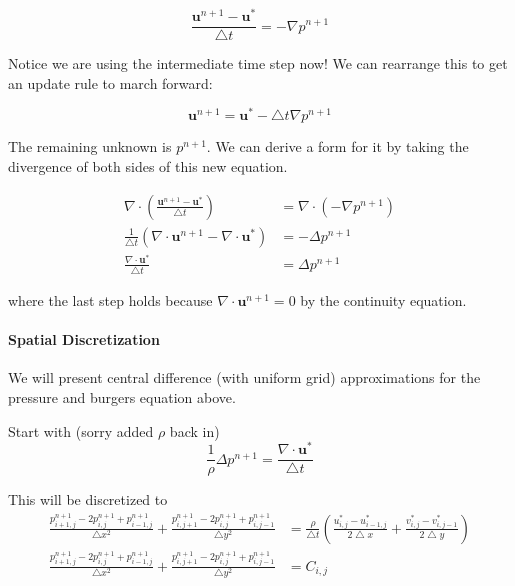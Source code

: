 \documentclass[12pt]{article}
\begin{document}
\begin{equation}
    \frac{\mathbf{u}^{n+1} - \mathbf{u}^*}{\bigtriangleup t} = -\nabla p^{n+1}
\end{equation}

Notice we are using the intermediate time step now! We can rearrange this to get an update rule to march forward:

\begin{equation}
    \mathbf{u}^{n+1} = \mathbf{u}^* - \bigtriangleup t \nabla p^{n+1}
\end{equation}

The remaining unknown is $p^{n+1}$. We can derive a form for it by taking the divergence of both sides of this new equation.

\begin{align*}
    \nabla \cdot (\frac{\mathbf{u}^{n+1} - \mathbf{u}^*}{\bigtriangleup t}) &= \nabla \cdot (-\nabla p^{n+1}) \\
    \frac{1}{\bigtriangleup t}(\nabla \cdot \mathbf{u}^{n+1} - \nabla \cdot \mathbf{u}^*) &= -\Delta p^{n+1} \\
    \frac{\nabla \cdot \mathbf{u}^*}{\bigtriangleup t} &= \Delta p^{n+1}
\end{align*}

where the last step holds because $\nabla \cdot \mathbf{u}^{n+1} = 0$ by the continuity equation.

\paragraph{Spatial Discretization}

We will present central difference (with uniform grid) approximations for the pressure and burgers equation above.

Start with (sorry added $\rho$ back in)
\begin{equation}
\frac{1}{\rho} \Delta p^{n+1} = \frac{\nabla \cdot \mathbf{u}^*}{\bigtriangleup t}
\end{equation}

This will be discretized to
\begin{align*}
    \frac{p^{n+1}_{i+1,j} - 2p^{n+1}_{i,j} + p^{n+1}_{i-1,j}}{\bigtriangleup x^2} + \frac{p^{n+1}_{i,j+1} - 2p^{n+1}_{i,j} + p^{n+1}_{i,j-1}}{\bigtriangleup y^2} &= \frac{\rho}{\bigtriangleup t}(\frac{u^*_{i,j} - u^*_{i-1,j}}{2\bigtriangleup x} + \frac{v^*_{i,j} - v^*_{i,j-1}}{2\bigtriangleup y}) \\
    \frac{p^{n+1}_{i+1,j} - 2p^{n+1}_{i,j} + p^{n+1}_{i-1,j}}{\bigtriangleup x^2} + \frac{p^{n+1}_{i,j+1} - 2p^{n+1}_{i,j} + p^{n+1}_{i,j-1}}{\bigtriangleup y^2} &= C_{i,j}
\end{align*}
\end{document}
